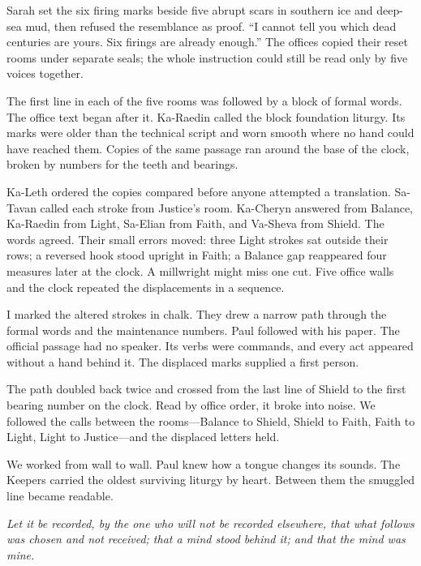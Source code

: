 Sarah set the six firing marks beside five abrupt scars in southern ice and deep-sea mud, then refused the resemblance as proof. ``I cannot tell you which dead centuries are yours. Six firings are already enough.'' The offices copied their reset rooms under separate seals; the whole instruction could still be read only by five voices together.\par

\ornament

The first line in each of the five rooms was followed by a block of formal words. The office text began after it. Ka-Raedin called the block foundation liturgy. Its marks were older than the technical script and worn smooth where no hand could have reached them. Copies of the same passage ran around the base of the clock, broken by numbers for the teeth and bearings.\par

Ka-Leth ordered the copies compared before anyone attempted a translation. Sa-Tavan called each stroke from Justice's room. Ka-Cheryn answered from Balance, Ka-Raedin from Light, Sa-Elian from Faith, and Va-Sheva from Shield. The words agreed. Their small errors moved: three Light strokes sat outside their rows; a reversed hook stood upright in Faith; a Balance gap reappeared four measures later at the clock. A millwright might miss one cut. Five office walls and the clock repeated the displacements in a sequence.\par

I marked the altered strokes in chalk. They drew a narrow path through the formal words and the maintenance numbers. Paul followed with his paper. The official passage had no speaker. Its verbs were commands, and every act appeared without a hand behind it. The displaced marks supplied a first person.\par

The path doubled back twice and crossed from the last line of Shield to the first bearing number on the clock. Read by office order, it broke into noise. We followed the calls between the rooms—Balance to Shield, Shield to Faith, Faith to Light, Light to Justice—and the displaced letters held.\par

We worked from wall to wall. Paul knew how a tongue changes its sounds. The Keepers carried the oldest surviving liturgy by heart. Between them the smuggled line became readable.\par

\emph{Let it be recorded, by the one who will not be recorded elsewhere, that what follows was chosen and not received; that a mind stood behind it; and that the mind was mine.}\par

